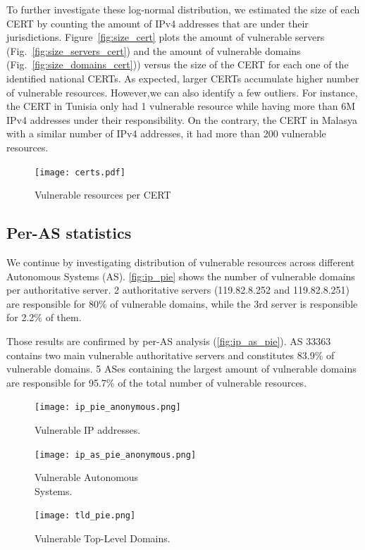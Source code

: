 To further investigate these log-normal distribution, we estimated the size of each CERT by counting the amount of IPv4 addresses that are under their jurisdictions. Figure~\ref{fig:size_cert} plots the amount of vulnerable servers (Fig.~\ref{fig:size_servers_cert}) and the amount of vulnerable domains (Fig.~\ref{fig:size_domains_cert})) versus the size of the CERT for each one of the identified national CERTs.
As expected, larger CERTs accumulate higher number of vulnerable resources. However,we can also identify a few outliers. For instance, the CERT in Tunisia only had 1 vulnerable resource while having more than 6M IPv4 addresses under their responsibility. On the contrary, the CERT in Malasya with a similar number of IPv4 addresses, it had more than 200 vulnerable resources. 


\begin{figure}[!hbt]
\centering
\texttt{[image: certs.pdf]}
\caption{Vulnerable resources per CERT}
\label{fig:certs}
\end{figure}

\subsection{Per-AS statistics}
We continue by investigating distribution of vulnerable resources across different Autonomous Systems (AS). \autoref{fig:ip_pie} shows the number of vulnerable domains per authoritative server. 2 authoritative servers (119.82.8.252 and 119.82.8.251) are responsible for 80\% of vulnerable domains, while the 3rd server is responsible for 2.2\% of them. 

Those results are confirmed by per-AS analysis (\autoref{fig:ip_as_pie}). AS 33363 contains two main vulnerable authoritative servers and constitutes 83.9\% of vulnerable domains. 5 ASes containing the largest amount of vulnerable domains are responsible for 95.7\% of the total number of vulnerable resources. 

\begin{figure}[!ht]
\begin{minipage}[t]{.33\textwidth}
    \texttt{[image: ip\_pie\_anonymous.png]}
    \caption{Vulnerable IP addresses.}
    \label{fig:ip_pie}
\end{minipage}%
\begin{minipage}[t]{.33\textwidth}
    \centering
    \texttt{[image: ip\_as\_pie\_anonymous.png]}
    \caption{Vulnerable Autonomous \\Systems.}
    \label{fig:ip_as_pie}
\end{minipage}%
\begin{minipage}[t]{.33\textwidth}
    \centering
    \texttt{[image: tld\_pie.png]}
    \caption{Vulnerable Top-Level Domains.}
    \label{fig:tld_pie}
\end{minipage}%

\end{figure}



